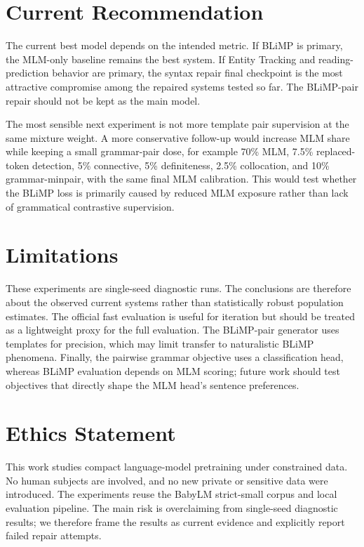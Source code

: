 \documentclass[11pt]{article}
\begin{document}
\section{Current Recommendation}

The current best model depends on the intended metric. If BLiMP is primary, the MLM-only baseline remains the best system. If Entity Tracking and reading-prediction behavior are primary, the syntax repair final checkpoint is the most attractive compromise among the repaired systems tested so far. The BLiMP-pair repair should not be kept as the main model.

The most sensible next experiment is not more template pair supervision at the same mixture weight. A more conservative follow-up would increase MLM share while keeping a small grammar-pair dose, for example 70\% MLM, 7.5\% replaced-token detection, 5\% connective, 5\% definiteness, 2.5\% collocation, and 10\% grammar-minpair, with the same final MLM calibration. This would test whether the BLiMP loss is primarily caused by reduced MLM exposure rather than lack of grammatical contrastive supervision.

\section{Limitations}

These experiments are single-seed diagnostic runs. The conclusions are therefore about the observed current systems rather than statistically robust population estimates. The official fast evaluation is useful for iteration but should be treated as a lightweight proxy for the full evaluation. The BLiMP-pair generator uses templates for precision, which may limit transfer to naturalistic BLiMP phenomena. Finally, the pairwise grammar objective uses a classification head, whereas BLiMP evaluation depends on MLM scoring; future work should test objectives that directly shape the MLM head's sentence preferences.

\section{Ethics Statement}

This work studies compact language-model pretraining under constrained data. No human subjects are involved, and no new private or sensitive data were introduced. The experiments reuse the BabyLM strict-small corpus and local evaluation pipeline. The main risk is overclaiming from single-seed diagnostic results; we therefore frame the results as current evidence and explicitly report failed repair attempts.
\end{document}
